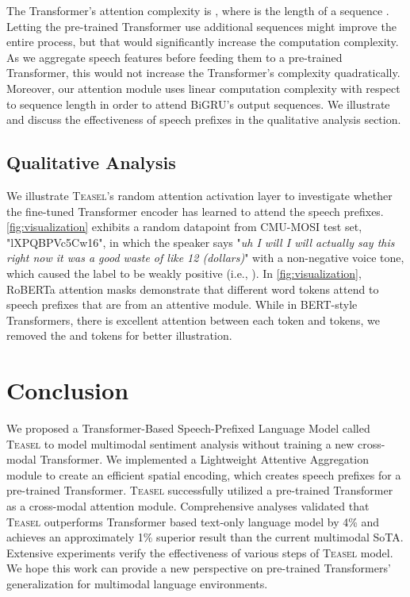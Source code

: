 \documentclass[letterpaper]{article} \usepackage{spconf,amsmath,graphicx}
\newcommand{\teasel}{\textsc{Teasel }}
\newcommand{\teaselns}{\textsc{Teasel}}
\begin{document}
The Transformer's attention complexity is , where  is the length of a sequence \cite{devlin2018bert}. Letting the pre-trained Transformer use additional sequences might improve the entire process, but that would significantly increase the computation complexity. As we aggregate speech features before feeding them to a pre-trained Transformer, this would not increase the Transformer's complexity quadratically. Moreover, our attention module uses linear computation complexity with respect to sequence length in order to attend BiGRU's output sequences. We illustrate and discuss the effectiveness of speech prefixes in the qualitative analysis section.




\subsection{Qualitative Analysis}

We illustrate \teaselns's random attention activation layer to investigate whether the fine-tuned Transformer encoder has learned to attend the speech prefixes. \autoref{fig:visualization} exhibits a random datapoint from CMU-MOSI test set, "lXPQBPVc5Cw16", in which the speaker says "\textit{uh I will I will actually say this right now it was a good waste of like 12 (dollars)}" with a non-negative voice tone, which caused the label to be weakly positive (i.e., ). In \autoref{fig:visualization}, RoBERTa attention masks demonstrate that different word tokens attend to speech prefixes that are from an attentive module. While in BERT-style Transformers, there is excellent attention between each token and  tokens, we removed the  and  tokens for better illustration.


\section{Conclusion}
\label{sec:conclusion}

We proposed a Transformer-Based Speech-Prefixed Language Model called \teasel to model multimodal sentiment analysis without training a new cross-modal Transformer. We implemented a Lightweight Attentive Aggregation module to create an efficient spatial encoding, which creates speech prefixes for a pre-trained Transformer. \teasel successfully utilized a pre-trained Transformer as a cross-modal attention module. Comprehensive analyses validated that \teasel outperforms Transformer based text-only language model by 4\% and achieves an approximately 1\% superior result than the current multimodal SoTA. Extensive experiments verify the effectiveness of various steps of \teasel model. We hope this work can provide a new perspective on pre-trained Transformers' generalization for multimodal language environments.




\end{document}
